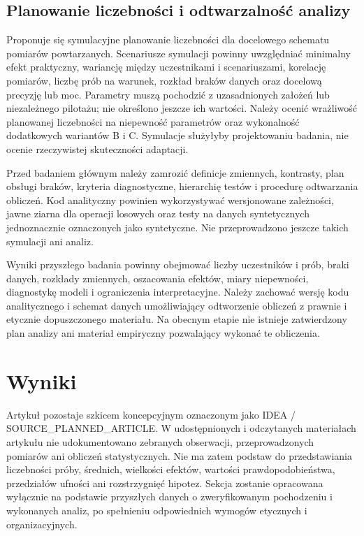 \documentclass[11pt,a4paper]{article}
\begin{document}
\subsection{Planowanie liczebności i odtwarzalność analizy}

Proponuje się symulacyjne planowanie liczebności dla docelowego schematu pomiarów powtarzanych. Scenariusze symulacji powinny uwzględniać minimalny efekt praktyczny, wariancję między uczestnikami i scenariuszami, korelację pomiarów, liczbę prób na warunek, rozkład braków danych oraz docelową precyzję lub moc. Parametry muszą pochodzić z uzasadnionych założeń lub niezależnego pilotażu; nie określono jeszcze ich wartości. Należy ocenić wrażliwość planowanej liczebności na niepewność parametrów oraz wykonalność dodatkowych wariantów B i C. Symulacje służyłyby projektowaniu badania, nie ocenie rzeczywistej skuteczności adaptacji.

Przed badaniem głównym należy zamrozić definicje zmiennych, kontrasty, plan obsługi braków, kryteria diagnostyczne, hierarchię testów i procedurę odtwarzania obliczeń. Kod analityczny powinien wykorzystywać wersjonowane zależności, jawne ziarna dla operacji losowych oraz testy na danych syntetycznych jednoznacznie oznaczonych jako syntetyczne. Nie przeprowadzono jeszcze takich symulacji ani analiz.

Wyniki przyszłego badania powinny obejmować liczby uczestników i prób, braki danych, rozkłady zmiennych, oszacowania efektów, miary niepewności, diagnostykę modeli i ograniczenia interpretacyjne. Należy zachować wersję kodu analitycznego i schemat danych umożliwiający odtworzenie obliczeń z prawnie i etycznie dopuszczonego materiału. Na obecnym etapie nie istnieje zatwierdzony plan analizy ani materiał empiryczny pozwalający wykonać te obliczenia.

\section{Wyniki}

Artykuł pozostaje szkicem koncepcyjnym oznaczonym jako IDEA / SOURCE\_PLANNED\_ARTICLE. W udostępnionych i odczytanych materiałach artykułu nie udokumentowano zebranych obserwacji, przeprowadzonych pomiarów ani obliczeń statystycznych. Nie ma zatem podstaw do przedstawiania liczebności próby, średnich, wielkości efektów, wartości prawdopodobieństwa, przedziałów ufności ani rozstrzygnięć hipotez. Sekcja zostanie opracowana wyłącznie na podstawie przyszłych danych o zweryfikowanym pochodzeniu i wykonanych analiz, po spełnieniu odpowiednich wymogów etycznych i organizacyjnych.
\end{document}
